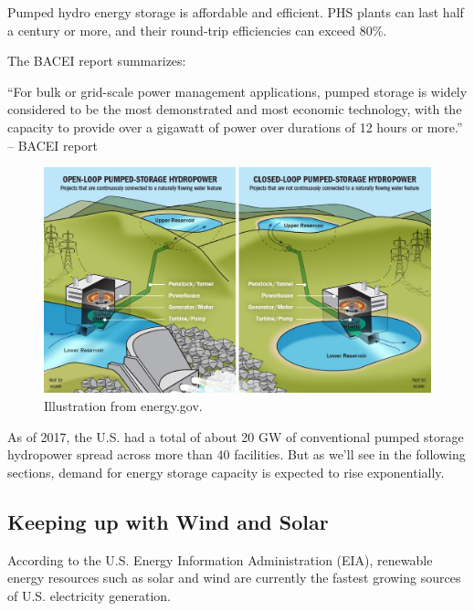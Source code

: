 \documentclass[hidelinks,12pt,a4paper]{article}
\begin{document}
Pumped hydro energy storage is affordable and efficient. PHS plants can last half a century or more, and their round-trip efficiencies can exceed 80\%. \cite{USGridEnergyStorageFactsheet}

The BACEI report summarizes:

\begin{displayquote}
“For bulk or grid-scale power management applications, pumped storage is widely considered to be the most demonstrated and most economic technology, with the capacity to provide over a gigawatt of power over durations of 12 hours or more.” \cite{EnergyStorageCaliforniaClimateandEnergyGoals} -- BACEI report
\end{displayquote}

\begin{figure}[ht!]
    \centering
    \includegraphics[width=1.00\textwidth]{111148-5000-wpto_pumped_storage_illustration_0.jpg}
    \caption{Illustration from energy.gov. \cite{EnergyGovPumpedStorageHydropower}}
\end{figure}
\FloatBarrier

As of 2017, the U.S. had a total of about 20 GW of conventional pumped storage hydropower spread across more than 40 facilities. \cite{EnergyStorageCaliforniaClimateandEnergyGoals} But as we'll see in the following sections, demand for energy storage capacity is expected to rise exponentially.


\subsection{Keeping up with Wind and Solar}
According to the U.S. Energy Information Administration (EIA), renewable energy resources such as solar and wind are currently the fastest growing sources of U.S. electricity generation. \cite{EIAForecastsRenewables}
\end{document}

